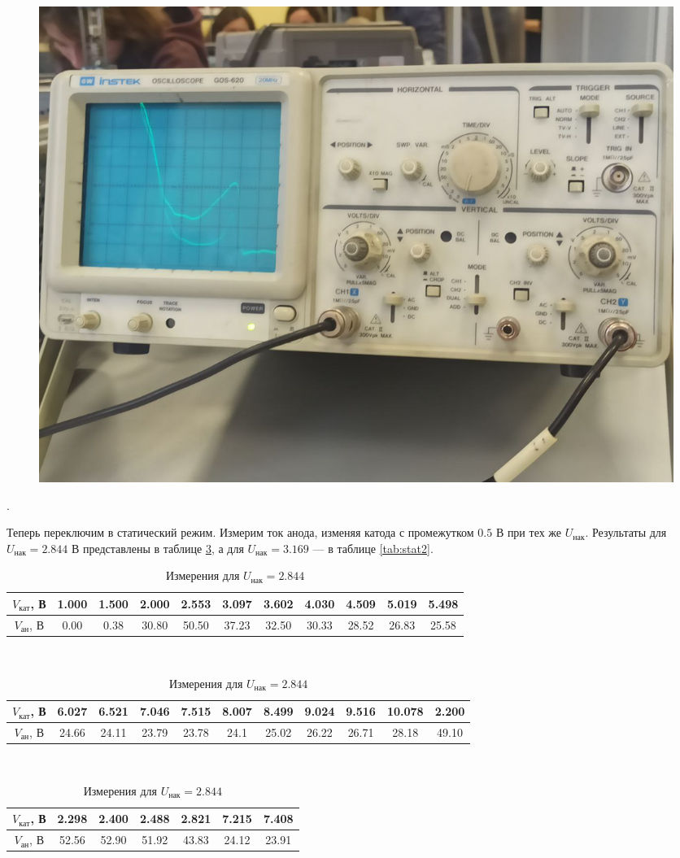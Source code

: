 \documentclass[a4paper, 12pt]{article}
\newcounter{Points}
\newcommand{\point}{\arabic{Points}. \addtocounter{Points}{1}}
\begin{document}
\begin{figure}[!h]
    \includegraphics[scale = 0.2]{dyn2}
    \centering
    \caption{}
    \label{pic:dyn2}
\end{figure}

\newpage

\point Теперь переключим в статический режим. Измерим ток анода, изменяя катода с промежутком $0.5$ В при тех же $U_{нак}$. Результаты для $U_{нак} = 2.844$ В представлены в таблице \ref{tab:stat1}, а для $U_{нак} = 3.169$ --- в таблице \ref{tab:stat2}.

\begin{table}[!h]
    \centering
    \begin{tabular}{|c|c|c|c|c|c|c|c|c|c|c|}
        \hline
        $V_{кат}$, В & 1.000 & 1.500 & 2.000 & 2.553 & 3.097 & 3.602 & 4.030 & 4.509 & 5.019 & 5.498 \\ \hline
        $V_{ан}$, В & 0.00 & 0.38 & 30.80 & 50.50 & 37.23 & 32.50 & 30.33 & 28.52 & 26.83 & 25.58 \\ \hline
    \end{tabular}
    ~\\
    \begin{tabular}{|c|c|c|c|c|c|c|c|c|c|c|}
        \hline
        $V_{кат}$, В & 6.027 & 6.521 & 7.046 & 7.515 & 8.007 & 8.499 & 9.024 & 9.516 & 10.078 & 2.200 \\ \hline
        $V_{ан}$, В & 24.66 & 24.11 & 23.79 & 23.78 & 24.1 & 25.02 & 26.22 & 26.71 & 28.18 & 49.10 \\ \hline
    \end{tabular}
    ~\\
    \begin{tabular}{|c|c|c|c|c|c|c|}
        \hline
        $V_{кат}$, В & 2.298 & 2.400 & 2.488 & 2.821 & 7.215 & 7.408 \\ \hline
        $V_{ан}$, В & 52.56 & 52.90 & 51.92 & 43.83 & 24.12 & 23.91 \\ \hline
    \end{tabular}
    \caption {Измерения для $U_{нак} = 2.844$}
    \label{tab:stat1}
\end{table}
\end{document}
